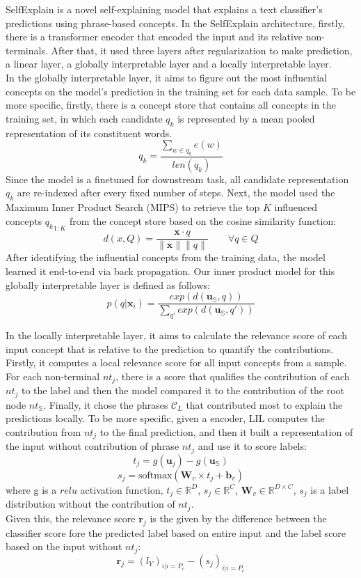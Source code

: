\documentclass{article}
\begin{document}
SelfExplain is a novel self-explaining model that explains a text classifier's predictions using phrase-based concepts. In the SelfExplain architecture, firstly, there is a transformer encoder that encoded the input and its relative non-terminals. After that, it used three layers after regularization to make prediction, a linear layer, a globally interpretable layer and a locally interpretable layer. \\
In the globally interpretable layer, it aims to figure out the most influential concepts on the model's prediction in the training set for each data sample. To be more specific, firstly, there is a concept store that contains all concepts in the training set, in which each candidate $q_k$ is represented by a mean pooled representation of its constituent words. $$q_k = \frac{\sum_{w \in q_k}{e(w)}}{len(q_k)}  $$ Since the model is a finetuned for downstream task, all candidate representation $q_k$ are re-indexed after every fixed number of steps. 
Next, the model used the Maximum Inner Product Search (MIPS) to retrieve the top $K$ influenced concepts ${q_k}_{1:K}$ from the concept store based on the cosine similarity function: 
$$d(x, Q) = \frac{\mathbf{x} \cdot q}{ \|\mathbf{x}\| \|q\|}  \qquad  \forall q \in Q$$
After identifying the influential concepts from the training data, the model learned it end-to-end via back propagation. Our inner product model for this globally interpretable layer is defined as follows:
$$  p(q|\mathbf{x}_i) = \frac{exp(d(\mathbf{u}_\mathbb{S}, q))}{\sum_{q'} exp(d(\mathbf{u}_\mathbb{S}, q'))}$$

In the locally interpretable layer, it aims to calculate the relevance score of each input concept that is relative to the prediction to quantify the contributions. Firstly, it computes a local relevance score for all input concepts from a sample. For each non-terminal $nt_j$, there is a score that qualifies the contribution of each $nt_j$ to the label and then the model compared it to the contribution of the root node $nt_\mathbb{S}$. Finally, it chose the phrases $\mathcal{C}_L$ that contributed most to explain the predictions locally. To be more specific, given a encoder, LIL computes the contribution from $nt_j$ to the final prediction, and then it built a representation of the input without contribution of phrase $nt_j$ and use it to score labels:
$$t_j = g(\mathbf{u}_j) - g(\mathbf{u}_\mathbb{S})$$
$$s_j = \textrm{softmax}(\mathbf{W}_v \times t_j + \mathbf{b}_v)$$
where g is a $relu$ activation function, $t_j \in \mathbb{R}^D$, $s_j \in \mathbb{R}^C$, $\mathbf{W}_v \in \mathbb{R}^{D \times C}$, $s_j$ is a label distribution without the contribution of $nt_j$. \\
Given this, the relevance score $\mathbf{r}_j$ is the given by the difference between the classifier score fore the predicted label based on entire input and the label score based on the input without $nt_j$:
$$\mathbf{r}_j = (l_Y)_{i|i=P_c} - (s_j)_{i|i=P_c}$$
\end{document}

